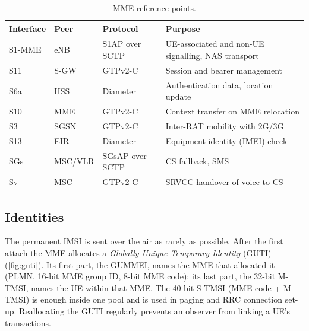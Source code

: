 \documentclass[11pt,a4paper]{article}
\begin{document}
\begin{table}[htbp]
\centering\small
\caption{MME reference points.}\label{tab:ifaces}
\begin{tabularx}{\linewidth}{@{}l l l Y@{}}
\toprule
{}Interface & Peer & Protocol & Purpose \\
\midrule
S1-MME & eNB      & S1AP over SCTP & UE-associated and non-UE signalling, NAS transport \cite{ts36413} \\
S11    & S-GW     & GTPv2-C        & Session and bearer management \cite{ts29274} \\
S6a    & HSS      & Diameter       & Authentication data, location update \cite{ts29272} \\
S10    & MME      & GTPv2-C        & Context transfer on MME relocation \\
S3     & SGSN     & GTPv2-C        & Inter-RAT mobility with 2G/3G \\
S13    & EIR      & Diameter       & Equipment identity (IMEI) check \\
SGs    & MSC/VLR  & SGsAP over SCTP & CS fallback, SMS \cite{ts23272} \\
Sv     & MSC      & GTPv2-C        & SRVCC handover of voice to CS \cite{ts23216} \\
\bottomrule
\end{tabularx}
\end{table}

\begin{acnfigure}
  \caption{The MME and its reference points. Dashed lines are control-plane interfaces.}
  \label{fig:ifaces}
\end{acnfigure}

\subsection{Identities}
The permanent IMSI is sent over the air as rarely as possible. After the first attach the MME allocates
a \emph{Globally Unique Temporary Identity} (GUTI) \cite{ts23003} (\cref{fig:guti}). Its first part,
the GUMMEI, names the MME that allocated it (PLMN, 16-bit MME group ID, 8-bit MME code); its last part,
the 32-bit M-TMSI, names the UE within that MME. The 40-bit S-TMSI (MME code + M-TMSI) is enough inside
one pool and is used in paging and RRC connection set-up. Reallocating the GUTI regularly prevents an
observer from linking a UE's transactions.

\begin{acnfigure}
  \caption{Structure of the GUTI and the identities derived from it.}
  \label{fig:guti}
\end{acnfigure}
\end{document}

